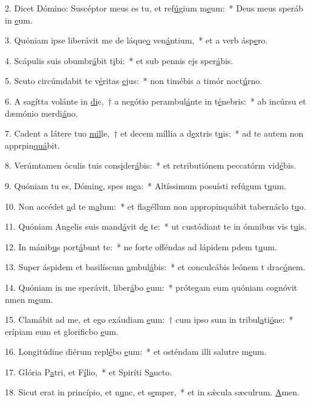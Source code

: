 2. Dicet Dómino: Suscéptor meus es tu, et ref\uline{ú}gium m\uline{e}um:~* Deus meus speráb in \uline{e}um.\par 
3. Quóniam ipse liberávit me de láque\uline{o} ven\uline{á}ntium,~* et a verb ásp\uline{e}ro.\par 
4. Scápulis suis obumbr\uline{á}bit t\uline{i}bi:~* et sub pennis ejs sper\uline{á}bis.\par 
5. Scuto circúmdabit te v\uline{é}ritas \uline{e}jus:~* non timébis a timór noct\uline{ú}rno.\par 
6. A sagítta volánte in \uline{di}e,~† a negótio perambul\uline{á}nte in t\uline{é}nebris:~* ab incúrsu et dæmónio merdi\uline{á}no.\par 
7. Cadent a látere tuo \uline{mil}le,~† et decem míllia a d\uline{e}xtris t\uline{u}is:~* ad te autem non apprpin\uline{quá}bit.\par 
8. Verúmtamen óculis tuis cons\uline{i}der\uline{á}bis:~* et retributiónem peccatórm vid\uline{é}bis.\par 
9. Quóniam tu es, Dómin\uline{e}, spes m\uline{e}a:~* Altíssimum posuísti refúgum t\uline{u}um.\par 
10. Non accédet \uline{a}d te m\uline{a}lum:~* et flagéllum non appropinquábit tabernáclo t\uline{u}o.\par 
11. Quóniam Angelis suis mand\uline{á}vit d\uline{e} te:~* ut custódiant te in ómnibus vis t\uline{u}is.\par 
12. In mánib\uline{u}s port\uline{á}bunt te:~* ne forte offéndas ad lápidem pdem t\uline{u}um.\par 
13. Super áspidem et basilíscum \uline{a}mbul\uline{á}bis:~* et conculcábis leónem t drac\uline{ó}nem.\par 
14. Quóniam in me sperávit, liber\uline{á}bo \uline{e}um:~* prótegam eum quóniam cognóvit nmen m\uline{e}um.\par 
15. Clamábit ad me, et ego exáudiam \uline{e}um:~† cum ipso sum in tribul\uline{a}ti\uline{ó}ne:~* erípiam eum et glorificbo \uline{e}um.\par 
16. Longitúdine diérum repl\uline{é}bo \uline{e}um:~* et osténdam illi salutre m\uline{e}um.\par 
17. Glória P\uline{a}tri, et F\uline{í}lio,~* et Spiríti S\uline{a}ncto.\par 
18. Sicut erat in princípio, et n\uline{u}nc, et s\uline{e}mper,~* et in sǽcula sæculrum. \uline{A}men.\par 
